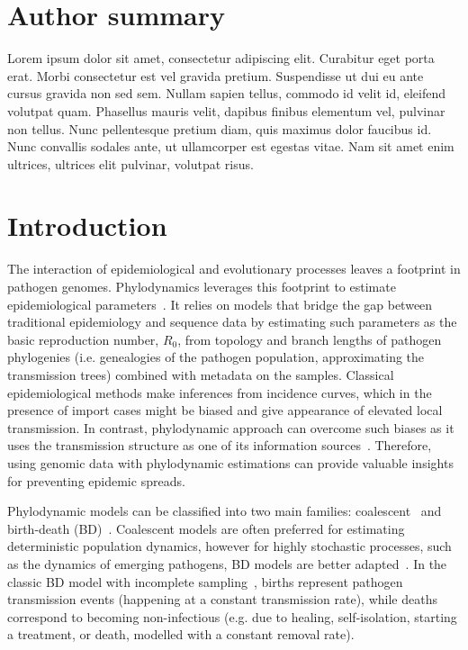 \documentclass[10pt,letterpaper]{article}
\begin{document}
\section*{Author summary}
Lorem ipsum dolor sit amet, consectetur adipiscing elit. Curabitur eget porta erat. Morbi consectetur est vel gravida pretium. Suspendisse ut dui eu ante cursus gravida non sed sem. Nullam sapien tellus, commodo id velit id, eleifend volutpat quam. Phasellus mauris velit, dapibus finibus elementum vel, pulvinar non tellus. Nunc pellentesque pretium diam, quis maximus dolor faucibus id. Nunc convallis sodales ante, ut ullamcorper est egestas vitae. Nam sit amet enim ultrices, ultrices elit pulvinar, volutpat risus.

\linenumbers

\section*{Introduction}
The interaction of epidemiological and evolutionary processes leaves a footprint in pathogen genomes. Phylodynamics leverages this footprint to estimate epidemiological parameters~\cite{Grenfell2004a,Volz2013}. It relies on models that bridge the gap between traditional epidemiology and sequence data by estimating such parameters as the basic reproduction number, $R_0$, from topology and branch lengths of pathogen phylogenies (i.e. genealogies of the pathogen population, approximating the transmission trees) combined with metadata on the samples. Classical epidemiological methods make inferences from incidence curves, which in the presence of import cases might be biased and give appearance of elevated local transmission. In contrast, phylodynamic approach can overcome such biases as it uses the transmission structure as one of its information sources~\cite{vaughanEstimatesEarlyOutbreakspecific2024}. Therefore, using genomic data with phylodynamic estimations can provide valuable insights for preventing epidemic spreads.


Phylodynamic models can be classified into two main families:  coalescent~\cite{Volz2009a,Drummond2005,Pybus2000a} and birth-death (BD)~\cite{Kendall1948,Maddison2007,Stadler2009,Stadler2010}. Coalescent models are often preferred for estimating deterministic population dynamics, however for highly stochastic processes, such as the dynamics of emerging pathogens, BD models are better adapted~\cite{Macpherson2021}. In the classic BD model with incomplete sampling~\cite{Stadler2009}, births represent pathogen transmission events (happening at a constant transmission rate), while deaths correspond to becoming non-infectious (e.g. due to healing, self-isolation, starting a treatment, or death, modelled with a constant removal rate). 
\end{document}
